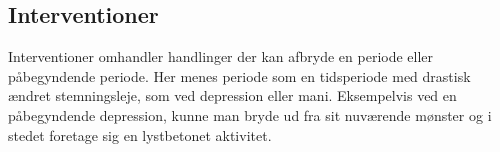 \subsection{Interventioner}
Interventioner omhandler handlinger der kan afbryde en periode eller påbegyndende periode.
Her menes periode som en tidsperiode med drastisk ændret stemningsleje, som ved depression eller mani.
Eksempelvis ved en påbegyndende depression, kunne man bryde ud fra sit nuværende mønster og i stedet foretage sig en lystbetonet aktivitet.
